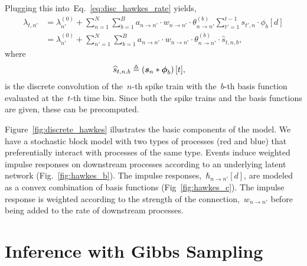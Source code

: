 Plugging this into~Eq.~\ref{eq:disc_hawkes_rate} yields,
\begin{align*}
  \lambda_{t,n'} &=
  \lambda_{n'}^{(0)} +
  \sum_{n = 1}^N  \sum_{b=1}^B a_{n \to n'} \cdot w_{n \to n'} \cdot 
  \theta_{n \to n'}^{(b)} \sum_{t'=1}^{t-1} s_{t',n} \cdot \phi_b[d] \\
  &=
  \lambda_{n'}^{(0)} +
  \sum_{n' = 1}^N  \sum_{b=1}^B a_{n \to n'} \cdot w_{n \to n'} \cdot
  \theta_{n \to n'}^{(b)} \cdot  \widehat{s}_{t,n,b},
\end{align*}
where
\begin{align*}
  \widehat{s}_{t,n,b} &\triangleq \left(\boldsymbol{s}_n \ast \boldsymbol{\phi}_b\right)[t],
\end{align*}
is the discrete convolution of the~$n$-th spike train with
the~$b$-th basis function evaluated at the~$t$-th time bin.
Since both the spike trains and the basis functions are given,
these can be precomputed.


Figure~\ref{fig:discrete_hawkes} illustrates the basic components of the model.
We have a stochastic block model with two types of processes (red and
blue) that preferentially interact with processes of the same type.
Events induce weighted impulse responses on downstream processes
according to an underlying latent network (Fig.~\ref{fig:hawkes_b}).
The impulse responses,~${\hbar_{n \to n'}[d]}$, are modeled as a convex
combination of basis functions (Fig~\ref{fig:hawkes_c}).  The impulse
response is weighted according to the strength of the
connection,~$w_{n \to n'}$ before being added to the rate of
downstream processes. 

\section{Inference with Gibbs Sampling}

